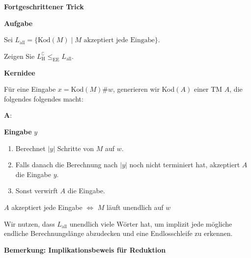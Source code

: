 \documentclass[a4paper, 11pt]{article}
\newcommand\myTitle[1]{{\large \textbf {#1}}}
\begin{document}
                        \myTitle{Fortgeschrittener Trick}

                            \textbf{Aufgabe}
                        
                            Sei $L_{\text{all}} = \{\text{Kod}(M) \mid M \text{ akzeptiert jede Eingabe}\}$.
                        
                            Zeigen Sie $L_{\text{H}}^\complement \leq_{\text{EE}} L_{\text{all}}$.
                            
                            
                            \textbf{Kernidee}
                        
                            Für eine Eingabe $x = \text{Kod}(M)\#w$, generieren wir Kod$(A)$ einer TM $A$, die folgendes folgendes macht:
                            
                            $\mathbf{A}:$
                        
                            \textbf{Eingabe} $y$
                            \begin{enumerate}[label=\arabic*.]
                                
                                \item Berechnet $|y|$ Schritte von $M$ auf $w$.
                                
                                \item Falls danach die Berechnung nach $|y|$ noch nicht terminiert hat, akzeptiert $A$ die Eingabe $y$.
                                
                                \item Sonst verwirft $A$ die Eingabe.
                            \end{enumerate}
                            
                            \begin{center}
                                $A$ akzeptiert jede Eingabe $\iff$ $M$ läuft unendlich auf $w$
                            \end{center}
                            
                            Wir nutzen, dass $L_{\text{all}}$ unendlich viele Wörter hat, um implizit jede mögliche endliche Berechnungslänge abzudecken und eine Endlosschleife zu erkennen.
                        
                
            
                        \myTitle{Bemerkung: Implikationsbeweis für Reduktion}
\end{document}
